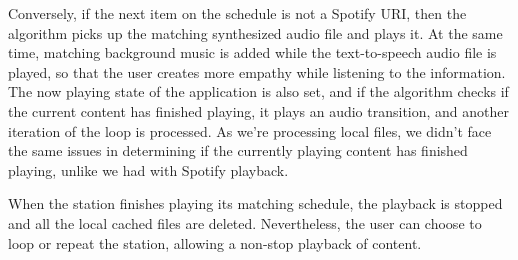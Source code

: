 Conversely, if the next item on the schedule is not a Spotify \ac{URI}, then the algorithm picks up the matching synthesized audio file and plays it. At the same time, matching background music is added while the text-to-speech audio file is played, so that the user creates more empathy while listening to the information. The now playing state of the application is also set, and if the algorithm checks if the current content has finished playing, it plays an audio transition, and another iteration of the loop is processed. As we're processing local files, we didn't face the same issues in determining if the currently playing content has finished playing, unlike we had with Spotify playback.

When the station finishes playing its matching schedule, the playback is stopped and all the local cached files are deleted. Nevertheless, the user can choose to loop or repeat the station, allowing a non-stop playback of content.

